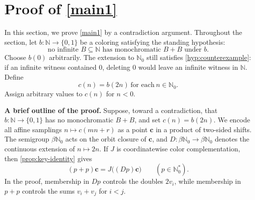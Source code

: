 \documentclass[reqno,12pt]{amsart}
\newcommand{\Nzero}{\mathbb N_0}
\newcommand{\bN}{\beta\Nzero}
\newcommand{\Nstar}{\Nzero^{*}}
\newcommand{\two}{\{0,1\}}
\def \N {\mathbb N}
\numberwithin{equation}{section}
\begin{document}
%






\section{Proof of \texorpdfstring{\cref{main1}}{the unweighted theorem}}\label{sec3}
In this section, we prove \cref{main1} by a contradiction argument. Throughout the section, let
$b:\N\to\two$ be a coloring satisfying the standing hypothesis:
\begin{equation*}\tag{H}\label{hyp:counterexample}
\text{no infinite $B\subseteq\N$ has monochromatic $B+B$ under $b$.}
\end{equation*}
Choose $b(0)$ arbitrarily.  The extension to $\Nzero$ still satisfies
\eqref{hyp:counterexample}: if an infinite witness contained $0$, deleting
$0$ would leave an infinite witness in $\N$.
Define
\begin{equation}\label{eq:def-c}
c(n)=b(2n)\ \text{for each}\ n\in\Nzero.
\end{equation}
Assign arbitrary values to $c(n)$ for $n<0$.


\noindent\textbf{A brief outline of the proof.}\enspace
Suppose, toward a contradiction, that $b:\N\to\two$ has no
monochromatic $B+B$, and set $c(n)=b(2n)$.  We encode all affine
samplings $n\mapsto c(mn+r)$ as a point $\mathbf c$ in a product of
two-sided shifts. The semigroup
$\bN$ acts on the orbit closure of $\mathbf c$, and
$D:\bN\to\bN$ denotes the continuous extension of $n\mapsto2n$.
If $J$ is coordinatewise color complementation, then
\cref{prop:key-identity} gives
\[
   (p+p)\mathbf c
   =
   J\bigl((Dp)\mathbf c\bigr)
   \qquad (p\in\Nstar).
\]
In the proof, membership in $Dp$ controls the doubles $2v_i$, while
membership in $p+p$ controls the sums $v_i+v_j$ for $i<j$.
\end{document}
